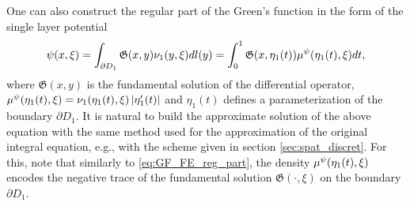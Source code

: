 One can also construct the regular part of the Green's function in the form of the single layer potential
\begin{align}\label{eq:GF_reg_part}
	\psi(x,\xi) 
	= \int_{\partial D_1} \mathfrak{G}(x,y) \nu_1(y,\xi) d l(y) 
	= \int_0^1 \mathfrak{G}(x,\eta_1(t)) \mu^{\psi}(\eta_1(t),\xi) dt,
\end{align}
where $\mathfrak{G}(x,y)$ is the fundamental solution of the differential operator, $\mu^{\psi}(\eta_1(t),\xi) = \nu_1(\eta_1(t),\xi) \left| \eta_1'(t) \right|$ and $\eta_1(t)$ defines a parameterization of the boundary $\partial D_1$. %
It is natural to build the approximate solution of the above equation with the same method used for the approximation of the original integral equation, e.g., with the scheme given in section \ref{sec:spat_discret}.
For this, note that similarly to \eqref{eq:GF_FE_reg_part}, the density $\mu^{\psi}(\eta_1(t),\xi)$ encodes the negative trace of the fundamental solution $\mathfrak{G}(\cdot,\xi)$ on the boundary $\partial D_1$.

